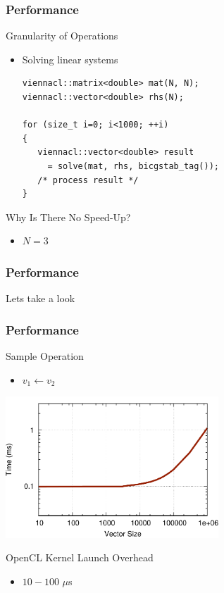 \begin{frame}[fragile]
\frametitle{Performance}
 \begin{block}{Granularity of Operations}
  \begin{itemize}
   \item Solving linear systems
   \begin{lstlisting}
viennacl::matrix<double> mat(N, N);
viennacl::vector<double> rhs(N);

for (size_t i=0; i<1000; ++i)
{
   viennacl::vector<double> result 
     = solve(mat, rhs, bicgstab_tag());
   /* process result */
}
   \end{lstlisting}
  \end{itemize}
 \end{block}

 \begin{block}{Why Is There No Speed-Up?}
   \begin{itemize}
    \item $N = 3$
   \end{itemize}
 \end{block}

\end{frame}


\begin{frame}[fragile]
\frametitle{Performance}

Lets take a look

\end{frame}



\begin{frame}[fragile]
\frametitle{Performance}
 \begin{block}{Sample Operation}
  \begin{itemize}
   \item $v_1 \leftarrow v_2$
  \end{itemize}

   \begin{center}\includegraphics[width=0.6\textwidth]{figs/kernel-launch.pdf} \end{center}
 \end{block}

 \begin{block}{OpenCL Kernel Launch Overhead}
   \begin{itemize}
    \item $10-100$ $\mu$s
   \end{itemize}
 \end{block}

\end{frame}



